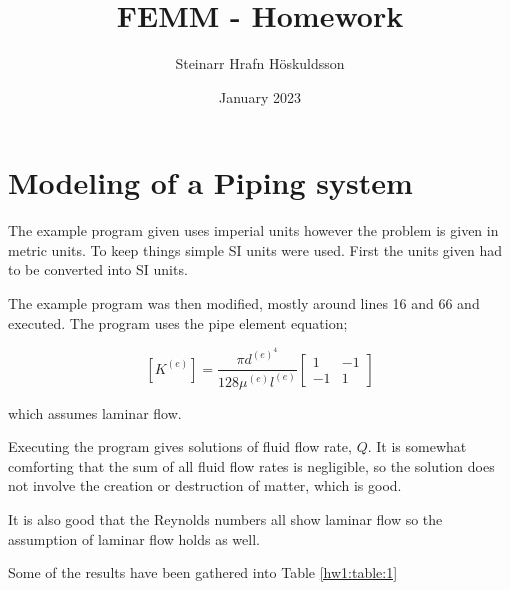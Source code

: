 \documentclass{article}
\title{FEMM - Homework}
\author{Steinarr Hrafn Höskuldsson}
\date{January 2023}
\newcommand{\mycomment}[1]{}
\begin{document}
\mycomment{

\begin{figure}[h]
    \centering
    \texttt{[image: LAB3/Basic1.png]}
    \caption{"Switch test" Breadboard set up}
    \label{fig:Switch_test}
\end{figure}



} %
\maketitle

\section{Modeling of a Piping system}
The example program given uses imperial units however the problem is given in metric units.  To keep things simple SI units were used. First the units given had to be converted into SI units. 

The example program was then modified, mostly around lines 16 and 66 and executed. The program uses the pipe element equation;

$$\left[K^{(e)}\right]=\frac{\pi d^{(e)^4}}{128 \mu^{(e)} l^{(e)}}\left[\begin{array}{rr}
1 & -1 \\
-1 & 1 
\end{array}\right] $$

which assumes laminar flow.

Executing the program gives solutions of fluid flow rate, $Q$. It is somewhat comforting that the sum of all fluid flow rates is negligible, so the solution does not involve the creation or destruction of matter, which is good.

It is also good that the Reynolds numbers all show laminar flow so the assumption of laminar flow holds as well.

Some of the results have been gathered into Table \ref{hw1:table:1} 

\newpage
\end{document}

